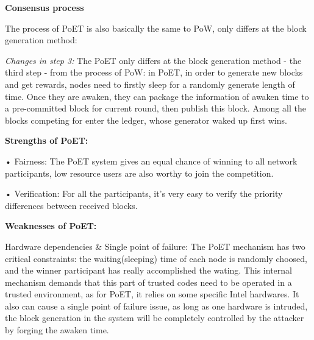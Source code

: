 \documentclass[doublespacing]{bmcart}
\begin{document}
\begin{CJK*}{UTF8}{gbsn}
	\par \textbf{Consensus process}
	\par The process of PoET is also basically the same to PoW, only differs at the block generation method: 
	\par \textsl{Changes in step 3:} The PoET only differs at the block generation method - the third step - from the process of PoW: in PoET, in order to generate new blocks and get rewards, nodes need to firstly sleep for a randomly generate length of time. Once they are awaken, they can package the information of awaken time to a pre-committed block for current round, then publish this block. Among all the blocks competing for enter the ledger, whose generator waked up first wins.
	\par \textbf{Strengths of PoET:}	
    \par • Fairness: The PoET system gives an equal chance of winning to all network participants, low resource users are also worthy to join the competition.
    \par • Verification: For all the participants, it’s very easy to verify the priority differences between received blocks.
\par \textbf{Weaknesses of PoET:}
    \par Hardware dependencies \& Single point of failure: The PoET mechanism has two critical constraints: the waiting(sleeping) time of each node is randomly choosed, and the winner participant has really accomplished the wating. This internal mechanism demands that this part of trusted codes need to be operated in a trusted environment, as for PoET, it relies on some specific Intel hardwares. It also can cause a single point of failure issue, as long as one hardware is intruded, the block generation in the system will be completely controlled by the attacker by forging the awaken time.


\end{CJK*}
\end{document}
